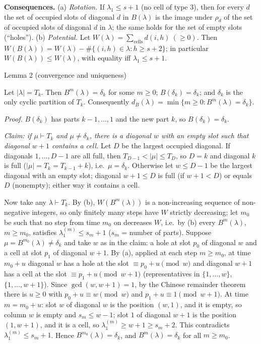 \textbf{Consequences.} (a) \emph{Rotation.} If \(\lambda_1\le s+1\) (no
cell of type 3), then for every \(d\) the set of occupied slots of
diagonal \(d\) in \(B(\lambda)\) is the image under \(\rho_d\) of the
set of occupied slots of diagonal \(d\) in \(\lambda\); the same holds
for the set of empty slots (``holes''). (b) \emph{Potential.} Let
\(W(\lambda)=\sum_{\text{cells}}d(i,h)\ (\ge 0)\). Then
\(W(B(\lambda))=W(\lambda)-\#\{(i,h)\in\lambda:h\ge s+2\}\); in
particular \(W(B(\lambda))\le W(\lambda)\), with equality iff
\(\lambda_1\le s+1\).

Lemma 2 (convergence and uniqueness)

Let \(|\lambda|=T_k\). Then \(B^m(\lambda)=\delta_k\) for some
\(m\ge0\); \(B(\delta_k)=\delta_k\); and \(\delta_k\) is the only cyclic
partition of \(T_k\). Consequently
\(d_B(\lambda)=\min\{m\ge0:B^m(\lambda)=\delta_k\}\).

\emph{Proof.} \(B(\delta_k)\) has parts \(k-1,\dots,1\) and the new part
\(k\), so \(B(\delta_k)=\delta_k\).

\emph{Claim: if \(\mu\vdash T_k\) and \(\mu\ne\delta_k\), there is a
diagonal \(w\) with an empty slot such that diagonal \(w+1\) contains a
cell.} Let \(D\) be the largest occupied diagonal. If diagonals
\(1,\dots,D-1\) are all full, then \(T_{D-1}<|\mu|\le T_D\), so \(D=k\)
and diagonal \(k\) is full (\(|\mu|=T_k=T_{k-1}+k\)),
i.e.~\(\mu=\delta_k\). Otherwise let \(w\le D-1\) be the largest
diagonal with an empty slot; diagonal \(w+1\le D\) is full (if
\(w+1<D\)) or equals \(D\) (nonempty); either way it contains a cell.

Now take any \(\lambda\vdash T_k\). By (b), \(W(B^m(\lambda))\) is a
non-increasing sequence of non-negative integers, so only finitely many
steps have \(W\) strictly decreasing; let \(m_0\) be such that no step
from time \(m_0\) on decreases \(W\), i.e.~by (b) every
\(B^m(\lambda)\), \(m\ge m_0\), satisfies \(\lambda^{(m)}_1\le s_m+1\)
(\(s_m\) = number of parts). Suppose \(\mu=B^{m_0}(\lambda)\ne\delta_k\)
and take \(w\) as in the claim: a hole at slot \(p_0\) of diagonal \(w\)
and a cell at slot \(p_1\) of diagonal \(w+1\). By (a), applied at each
step \(m\ge m_0\), at time \(m_0+u\) diagonal \(w\) has a hole at the
slot \(\equiv p_0+u\pmod w\) and diagonal \(w+1\) has a cell at the slot
\(\equiv p_1+u\pmod{w+1}\) (representatives in \(\{1,\dots,w\}\),
\(\{1,\dots,w+1\}\)). Since \(\gcd(w,w+1)=1\), by the Chinese remainder
theorem there is \(u\ge0\) with \(p_0+u\equiv w\pmod w\) and
\(p_1+u\equiv1\pmod{w+1}\). At time \(m=m_0+u\): slot \(w\) of diagonal
\(w\) is the position \((w,1)\), and it is empty, so column \(w\) is
empty and \(s_m\le w-1\); slot \(1\) of diagonal \(w+1\) is the position
\((1,w+1)\), and it is a cell, so \(\lambda^{(m)}_1\ge w+1\ge s_m+2\).
This contradicts \(\lambda^{(m)}_1\le s_m+1\). Hence
\(B^{m_0}(\lambda)=\delta_k\), and \(B^m(\lambda)=\delta_k\) for all
\(m\ge m_0\).

